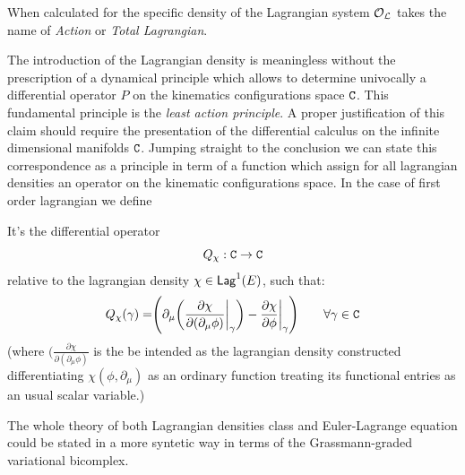 \documentclass[Main]{subfiles}
\begin{document}
	\begin{notationfix}
		When calculated for the specific density of the Lagrangian system $\mathcal{O}_{\mathcal{L}}$ takes the name of \emph{Action} or \emph{Total Lagrangian}. 
	\end{notationfix}

	The introduction of the Lagrangian density is meaningless without the prescription of a dynamical principle which allows to determine univocally a differential operator $P$ on the kinematics configurations space $\mathtt{C}$.
	This fundamental principle is the \emph{least action principle}.
	A proper justification of this claim should require the presentation of the differential calculus on the infinite dimensional manifolds $\mathtt{C}$. 
	Jumping straight to the conclusion we can state this correspondence as a principle  in term of a function which assign for all lagrangian densities an operator on the kinematic configurations space. In the case of first order lagrangian we define
	\begin{definition}
		It's the differential operator
		\begin{displaymath}
			Q_\chi : \mathtt{C} \rightarrow \mathtt{C}
		\end{displaymath}
		relative to the lagrangian density $\chi \in \mathsf{Lag}^1(E)$, such that:
		\begin{equation}
			Q_\chi (\gamma) = \Biggr( \partial_\mu \biggr( \frac{\partial \chi}{\partial(\partial_\mu \phi)} \biggr\vert_\gamma \biggr) - \frac{\partial \chi}{\partial \phi}\biggr\vert_\gamma \Biggr) \qquad \forall \gamma \in \mathtt{C}
		\end{equation}
		(where 	$\biggr( \frac{\partial \chi}{\partial(\partial_\mu \phi)}$ is the be intended as the lagrangian density constructed differentiating $\chi(\phi, \partial_\mu)$ as an ordinary function treating its functional entries as an usual scalar variable.)
	\end{definition}
	
	\begin{observation}
		The whole theory of both Lagrangian densities class and Euler-Lagrange equation could be stated in a more syntetic way in terms of the Grassmann-graded variational bicomplex.\cite{Giachetta2009}\cite{Sardanashvily}
	\end{observation}
	
		

\end{document}
